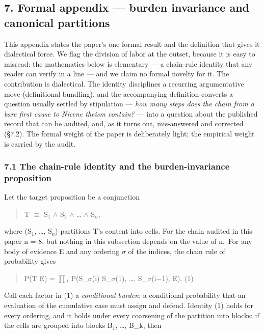 \subsection{7. Formal appendix --- burden invariance and canonical partitions}\label{formal-appendix-burden-invariance-and-canonical-partitions}

This appendix states the paper's one formal result and the definition that gives it dialectical force. We flag the division of labor at the outset, because it is easy to misread: the mathematics below is elementary --- a chain-rule identity that any reader can verify in a line --- and we claim no formal novelty for it. The contribution is dialectical. The identity disciplines a recurring argumentative move (definitional bundling), and the accompanying definition converts a question usually settled by stipulation --- \emph{how many steps does the chain from a bare first cause to Nicene theism contain?} --- into a question about the published record that can be audited, and, as it turns out, mis-answered and corrected (\S{}7.2). The formal weight of the paper is deliberately light; the empirical weight is carried by the audit.

\subsubsection{7.1 The chain-rule identity and the burden-invariance proposition}\label{the-chain-rule-identity-and-the-burden-invariance-proposition}

Let the target proposition be a conjunction

\begin{quote}
T $\equiv$ S$_1$ $\wedge$ S$_2$ $\wedge$ \ldots{} $\wedge$ S$_n$,
\end{quote}

where (S$_1$, \ldots, S$_n$) partitions T's content into cells. For the chain audited in this paper n = 8, but nothing in this subsection depends on the value of n.~For any body of evidence E and any ordering $\sigma$ of the indices, the chain rule of probability gives

\begin{quote}
P(T \textbar{} E) = $\prod$$_i$ P(S\_$\sigma$(i) \textbar{} S\_$\sigma$(1), \ldots, S\_$\sigma$(i$-$1), E). (1)
\end{quote}

Call each factor in (1) a \emph{conditional burden}: a conditional probability that an evaluation of the cumulative case must assign and defend. Identity (1) holds for every ordering, and it holds under every coarsening of the partition into blocks: if the cells are grouped into blocks B$_1$, \ldots, B\_k, then

